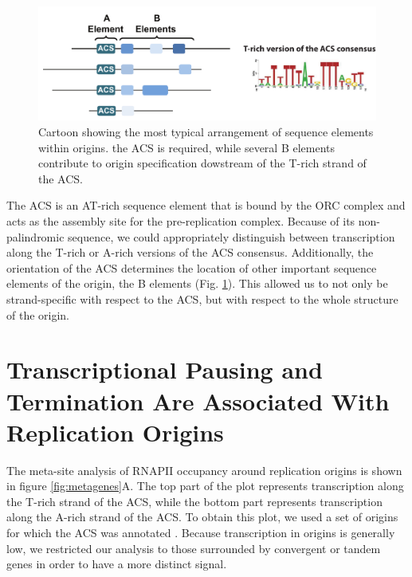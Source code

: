 \begin{figure}[ht]

\centering
\includegraphics[width=\textwidth]{figures/results/acs}
\caption[ACS consensus and arrangement relative to other origin DNA elements]{Cartoon showing the most typical arrangement of sequence elements within origins. the ACS is required, while several B elements contribute to origin specification dowstream of the T-rich strand of the ACS.}
\label{fig:originSchema}

\end{figure}

The ACS is an AT-rich sequence element that is bound by the ORC complex and acts as the assembly site for the pre-replication complex. Because of its non-palindromic sequence, we could appropriately distinguish between transcription along the T-rich or A-rich versions of the ACS consensus. Additionally, the orientation of the ACS determines the location of other important sequence elements of the origin, the B elements (Fig. \ref{fig:originSchema}). This allowed us to not only be strand-specific with respect to the ACS, but with respect to the whole structure of the origin. 

\singlespacing
\section{Transcriptional Pausing and Termination Are Associated With Replication Origins}
\doublespacing

The meta-site analysis of RNAPII occupancy around replication origins is shown in figure \ref{fig:metagenes}A. The top part of the plot represents transcription along the T-rich strand of the ACS, while the bottom part represents transcription along the A-rich strand of the ACS. To obtain this plot, we used a set of origins for which the ACS was annotated \cite{nieduszynski:2006:genomewide}. Because transcription in origins is generally low, we restricted our analysis to those surrounded by convergent or tandem genes in order to have a more distinct signal. 



